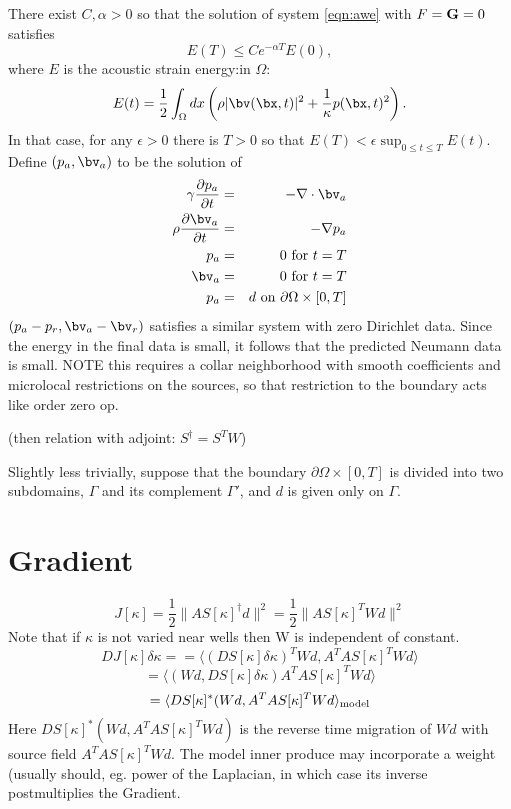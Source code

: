  There exist $C, \alpha > 0$ so
that the solution of system \ref{eqn:awe} with $F = {\bf G} = 0$
satisfies
\[
E(T) \le Ce^{-\alpha T} E(0),
\]
where $E$ is the acoustic strain energy:in $\Omega$:
\[
E(t) = \frac{1}{2}\int_{\Omega} dx \left(\rho |\bv(\bx,t)|^2 +
  \frac{1}{\kappa} p(\bx,t)^2\right).
\]
In that case, for any $\epsilon > 0$ there is $T>0$ so that $E(T) <
\epsilon \sup_{0 \le t \le T}E(t)$. Define $(p_a,\bv_a)$ to be the
solution of
\begin{eqnarray}
\label{eqn:awer}
\gamma \frac{\partial p_a}{\partial t} & = & - \nabla \cdot \bv_a \nonumber \\
\rho \frac{\partial \bv_a}{\partial t} & = & - \nabla p_a \nonumber \\
p_a & =& 0 \mbox{ for } t= T\nonumber\\ 
\bv_a & = & 0 \mbox{ for } t= T \\
p_a & = & d \mbox{ on } \partial \Omega \times [0,T]
\end{eqnarray}
$(p_a-p_r,\bv_a-\bv_r)$ satisfies a similar system with zero Dirichlet
data. Since the energy in the final data is small, it follows that the
predicted Neumann data is small. NOTE this requires a collar
neighborhood with smooth coefficients and microlocal restrictions on
the sources, so that restriction to the boundary acts like order zero op.

(then relation with adjoint: $S^{\dagger} = S^TW$)


Slightly less trivially, suppose that the boundary $\partial \Omega
\times [0,T]$ is divided into two subdomains, $\Gamma$ and its
complement $\Gamma'$, and $d$ is given only on $\Gamma$.

\section{Gradient}
\[
J[\kappa] = \frac{1}{2}\|AS[\kappa]^{\dagger}d\|^2=\frac{1}{2}\|AS[\kappa]^TWd\|^2
\]
Note that if $\kappa$ is not varied near wells then W is independent
of constant.
\[
DJ[\kappa]\delta \kappa= = \langle(DS[\kappa]\delta \kappa)^T Wd, A^TA 
S[\kappa]^TWd\rangle
\]
\begin{equation}
\label{eqn:deriv}
=\langle( Wd, DS[\kappa]\delta \kappa) A^TA S[\kappa]^TWd\rangle
\end{equation}
\begin{equation}
\label{eqn:grad}
=\langle DS[\kappa]^*(Wd,A^TAS[\kappa]^TWd\rangle_{\rm model}
\end{equation}
Here $DS[\kappa]^*(Wd,A^TAS[\kappa]^TWd)$ is the reverse time
migration of $Wd$ with source field $A^TA S[\kappa]^TWd$. The model
inner produce may incorporate a weight (usually should, eg. power of
the Laplacian, in which case its inverse postmultiplies the Gradient.

